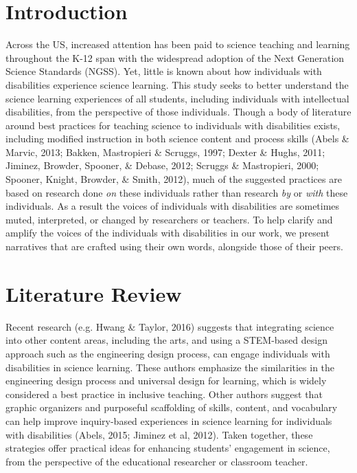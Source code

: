 \documentclass[11pt]{sig-alternate}
\begin{document}
\pagebreak
\pagebreak

\vspace{5mm}
\section*{\vspace{140mm}}
\begin{large}
\section*{Introduction}
Across the US, increased attention has been paid to science teaching and learning throughout the K-12 span with the widespread adoption of the Next Generation Science Standards (NGSS). Yet, little is known about how individuals with disabilities experience science learning. This study seeks to better understand the science learning experiences of all students, including individuals with intellectual disabilities, from the perspective of those individuals. Thou\-gh a body of literature around best practices for teaching science to individuals with disabilities exists, including modified instruction in both science content and process skills (Abels \& Marvic, 2013; Bakken, Mastropieri \& Scruggs, 1997; Dexter \& Hughs, 2011; Jiminez, Browder, Spooner, \& Debase, 2012; Scruggs \& Mastropieri, 2000; Spooner, Knight, Browder, \& Smith, 2012), much of the suggested practices are based on research done \textit{on} these individuals rather than research \textit{by} or \textit{with} these individuals. As a result the voices of individuals with disabilities are sometimes muted, interpreted, or changed by researchers or teachers. To help clarify and amplify the voices of the individuals with disabilities in our work, we present narratives that are crafted using their own words, alongside those of their peers. 

\section*{Literature Review}
Recent research (e.g. Hwang \& Taylor, 2016) suggests that integrating science into other content areas, including the arts, and using a STEM-based design approach such as the engineering design process, can engage individuals with disabilities in science learning. These authors emphasize the similarities in the engineering design process and universal design for learning, which is widely considered a best practice in inclusive teaching. Other authors suggest that graphic organizers and purposeful scaffolding of skills, content, and vocabulary can help improve inquiry-based experiences in science learning for individuals with disabilities (Abels, 2015; Jiminez et al, 2012). Taken together, these strategies offer practical ideas for enhancing students’ engagement in science, from the perspective of the educational researcher or classroom teacher. 


\end{large}
\end{document}
